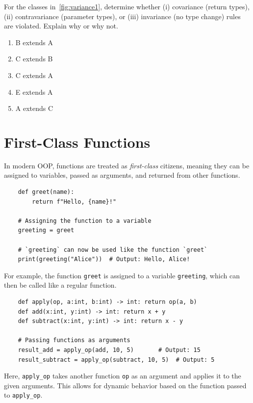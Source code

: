 \documentclass[oneside,11pt,dvipsnames]{book}
\newcommand{\code}[1]{\texttt{#1}}
\begin{document}
For the classes in~\autoref{fig:variance1}, determine whether (i) covariance (return types), (ii) contravariance (parameter types), or (iii) invariance (no type change) rules are violated. Explain why or why not.

\begin{enumerate}
    \item B extends A
	\item C extends B
    \item C extends A
	\item E extends A
	\item A extends C
\end{enumerate}
    

\chapter{First-Class Functions}\label{chap:first-class-functions}

In modern OOP, functions are treated as \emph{first-class} citizens, meaning they can be assigned to variables, passed as arguments, and returned from other functions.


\begin{lstlisting}
    def greet(name):
        return f"Hello, {name}!"

    # Assigning the function to a variable
    greeting = greet

    # `greeting` can now be used like the function `greet`
    print(greeting("Alice"))  # Output: Hello, Alice!
\end{lstlisting}

For example, the function \code{greet} is assigned to a variable \code{greeting}, which can then be called like a regular function. 

\begin{lstlisting}
    def apply(op, a:int, b:int) -> int: return op(a, b)        
    def add(x:int, y:int) -> int: return x + y        
    def subtract(x:int, y:int) -> int: return x - y        

    # Passing functions as arguments
    result_add = apply_op(add, 10, 5)       # Output: 15
    result_subtract = apply_op(subtract, 10, 5)  # Output: 5
\end{lstlisting}

Here, \code{apply\_op} takes another function \code{op} as an argument and applies it to the given arguments. This allows for dynamic behavior based on the function passed to \code{apply\_op}.
\end{document}
